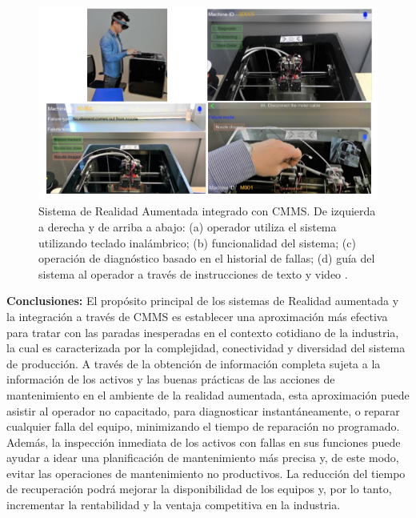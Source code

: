 \begin{description}
\begin{figure}[H]
\centering
\includegraphics[scale=0.7]{images/arsistema.png}
\caption{Sistema de Realidad Aumentada integrado con CMMS. De izquierda a derecha y de arriba a abajo: (a) operador utiliza el sistema utilizando teclado inalámbrico; (b) funcionalidad del sistema; (c) operación de diagnóstico basado en el historial de fallas; (d) guía del sistema al operador a través de instrucciones de texto y video \citep{aransyash2019}.}
\end{figure} 
\end{description}

\begin{description}
\item \textbf{Conclusiones:} El propósito principal de los sistemas de Realidad aumentada y la integración a través de CMMS es establecer una aproximación más efectiva para tratar con las paradas inesperadas en el contexto cotidiano de la industria, la cual es caracterizada por la complejidad, conectividad y diversidad del sistema de producción. A través de la obtención de información completa sujeta a la información de los activos y las buenas prácticas de las acciones de mantenimiento en el ambiente de la realidad aumentada, esta aproximación puede asistir al operador no capacitado, para diagnosticar instantáneamente, o reparar cualquier falla del equipo, minimizando el tiempo de reparación no programado. Además, la inspección inmediata de los activos con fallas en sus funciones puede ayudar a idear una planificación de mantenimiento más precisa y, de este modo, evitar las operaciones de mantenimiento no productivos. La reducción del tiempo de recuperación podrá mejorar la disponibilidad de los equipos y, por lo tanto, incrementar la rentabilidad y la ventaja competitiva en la industria.
\end{description}
